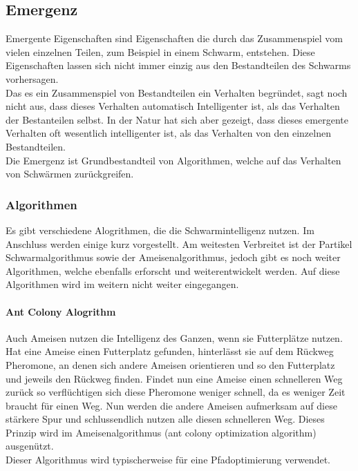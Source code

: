 		\subsection{Emergenz}
		Emergente Eigenschaften sind Eigenschaften die durch das Zusammenspiel vom vielen einzelnen Teilen, zum Beispiel in einem Schwarm, entstehen. Diese Eigenschaften lassen sich nicht immer einzig aus den Bestandteilen des Schwarms vorhersagen. \\
		Das es ein Zusammenspiel von Bestandteilen ein Verhalten begründet, sagt noch nicht aus, dass dieses Verhalten automatisch Intelligenter ist, als das Verhalten der Bestanteilen selbst. In der Natur hat sich aber gezeigt, dass dieses emergente Verhalten oft wesentlich intelligenter ist, als das Verhalten von den einzelnen Bestandteilen. \\
		Die Emergenz ist Grundbestandteil von Algorithmen, welche auf das Verhalten von Schwärmen zurückgreifen.
		
		
				
		\subsubsection{Algorithmen}
		Es gibt verschiedene Alogrithmen, die die Schwarmintelligenz nutzen. Im Anschluss werden einige kurz vorgestellt. Am weitesten Verbreitet ist der Partikel Schwarmalgorithmus sowie der Ameisenalgorithmus, jedoch gibt es noch weiter Algorithmen, welche ebenfalls erforscht und weiterentwickelt werden. Auf diese Algorithmen wird im weitern nicht weiter eingegangen.
		
		\paragraph{Ant Colony Alogrithm}
		$\;$ \\
		Auch Ameisen nutzen die Intelligenz des Ganzen, wenn sie Futterplätze nutzen. Hat eine Ameise einen Futterplatz gefunden, hinterlässt sie auf dem Rückweg Pheromone, an denen sich andere Ameisen orientieren und so den Futterplatz und jeweils den Rückweg finden. Findet nun eine Ameise einen schnelleren Weg zurück so verflüchtigen sich diese Pheromone weniger schnell, da es weniger Zeit braucht für einen Weg. Nun werden die andere Ameisen aufmerksam auf diese stärkere Spur und schlussendlich nutzen alle diesen schnelleren Weg. Dieses Prinzip wird im Ameisenalgorithmus (ant colony optimization algorithm) ausgenützt.\\Dieser Algorithmus wird typischerweise für eine Pfadoptimierung verwendet.
		
